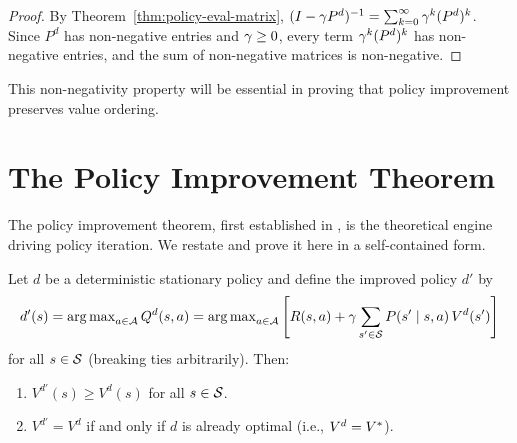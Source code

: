 \documentclass[11pt,a4paper]{article}
\begin{document}
\begin{proof}
By Theorem~\ref{thm:policy-eval-matrix},
$(I - \gamma P^d)^{-1} = \sum_{k=0}^\infty \gamma^k (P^d)^k$.
Since $P^d$ has non-negative entries and $\gamma \geq 0$, every
term $\gamma^k (P^d)^k$ has non-negative entries, and the sum
of non-negative matrices is non-negative.
\end{proof}

This non-negativity property will be essential in proving that policy
improvement preserves value ordering.


\section{The Policy Improvement Theorem}
\label{sec:policy-improvement}

The policy improvement theorem, first established in
\citet{howard1960}, is the theoretical engine driving policy iteration.
We restate and prove it here in a self-contained form.

\begin{theorem}
\label{thm:pi-theorem}
Let $d$ be a deterministic stationary policy and define the improved
policy $d'$ by
\begin{equation}
\label{eq:greedy-improve}
    d'(s) = \operatorname{arg\,max}_{a \in \mathcal{A}} Q^d(s,a)
    = \operatorname{arg\,max}_{a \in \mathcal{A}} \left[ R(s,a) + \gamma
    \sum_{s' \in \mathcal{S}} P(s' \mid s,a)\, V^d(s') \right]
\end{equation}
for all $s \in \mathcal{S}$ (breaking ties arbitrarily). Then:
\begin{enumerate}
    \item $V^{d'}(s) \geq V^d(s)$ for all $s \in \mathcal{S}$.
    \item $V^{d'} = V^d$ if and only if $d$ is already optimal
    (i.e., $V^d = V^*$).
\end{enumerate}
\end{theorem}
\end{document}
